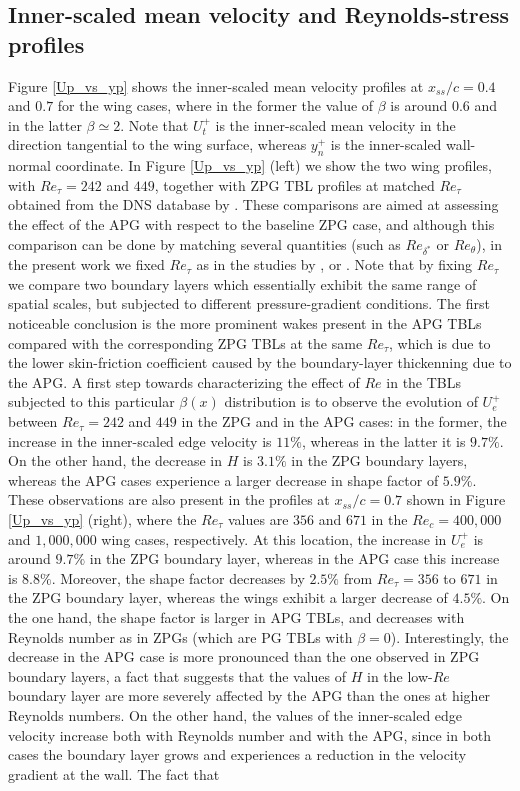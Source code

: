 \subsection{Inner-scaled mean velocity and Reynolds-stress profiles}

Figure \ref{Up_vs_yp} shows the inner-scaled mean velocity profiles at $x_{ss} /c =0.4$ and $0.7$ for the wing cases, where in the former the value of $\beta$ is around $0.6$ and in the latter $\beta \simeq 2$. Note that $U^{+}_{t}$ is the inner-scaled mean velocity in the direction tangential to the wing surface, whereas $y^{+}_{n}$ is the inner-scaled wall-normal coordinate. In Figure \ref{Up_vs_yp} (left) we show the two wing profiles, with $Re_{\tau}=242$ and $449$, together with ZPG TBL profiles at matched $Re_{\tau}$ obtained from the DNS database by \cite{schlatter10}. These comparisons are aimed at assessing the effect of the APG with respect to the baseline ZPG case, and although this comparison can be done by matching several quantities (such as $Re_{\delta^{*}}$ or $Re_{\theta}$), in the present work we fixed $Re_{\tau}$ as in the studies by \cite{monty_et_al}, \cite{harun_et_al} or \cite{bobke_et_al}. Note that by fixing $Re_{\tau}$ we compare two boundary layers which essentially exhibit the same range of spatial scales, but subjected to different pressure-gradient conditions. The first noticeable conclusion is the more prominent wakes present in the APG TBLs compared with the corresponding ZPG TBLs at the same $Re_{\tau}$, which is due to the lower skin-friction coefficient caused by the boundary-layer thickenning due to the APG. A first step towards characterizing the effect of $Re$ in the TBLs subjected to this particular $\beta(x)$ distribution is to observe the evolution of $U^{+}_{e}$ between $Re_{\tau}=242$ and $449$ in the ZPG and in the APG cases: in the former, the increase in the inner-scaled edge velocity is $11\%$, whereas in the latter it is $9.7\%$. On the other hand, the decrease in $H$ is $3.1\%$ in the ZPG boundary layers, whereas the APG cases experience a larger decrease in shape factor of $5.9\%$. These observations are also present in the profiles at $x_{ss}/c=0.7$ shown in Figure \ref{Up_vs_yp} (right), where the $Re_{\tau}$ values are $356$ and $671$ in the $Re_{c}=400,000$ and $1,000,000$ wing cases, respectively. At this location, the increase in $U^{+}_{e}$ is around $9.7\%$ in the ZPG boundary layer, whereas in the APG case this increase is $8.8\%$. Moreover, the shape factor decreases by $2.5\%$ from $Re_{\tau}=356$ to $671$ in the ZPG boundary layer, whereas the wings exhibit a larger decrease of $4.5\%$. On the one hand, the shape factor is larger in APG TBLs, and decreases with Reynolds number as in ZPGs (which are PG TBLs with $\beta=0$). Interestingly, the decrease in the APG case is more pronounced than the one observed in ZPG boundary layers, a fact that suggests that the values of $H$ in the low-$Re$ boundary layer are more severely affected by the APG than the ones at higher Reynolds numbers. On the other hand, the values of the inner-scaled edge velocity increase both with Reynolds number and with the APG, since in both cases the boundary layer grows and experiences a reduction in the velocity gradient at the wall. The fact that 